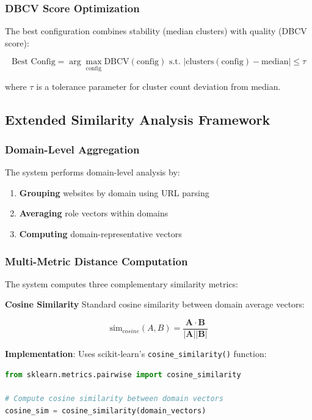 \subsubsection{DBCV Score Optimization}
The best configuration combines stability (median clusters) with quality (DBCV score):

\begin{equation}
\text{Best Config} = \arg\max_{\text{config}} \text{DBCV}(\text{config}) \text{ s.t. } |\text{clusters}(\text{config}) - \text{median}| \leq \tau
\end{equation}

where $\tau$ is a tolerance parameter for cluster count deviation from median.

\subsection{Extended Similarity Analysis Framework}
\label{subsec:more-similarity}

\subsubsection{Domain-Level Aggregation}
The system performs domain-level analysis by:

\begin{enumerate}
    \item \textbf{Grouping} websites by domain using URL parsing
    \item \textbf{Averaging} role vectors within domains
    \item \textbf{Computing} domain-representative vectors
\end{enumerate}

\subsubsection{Multi-Metric Distance Computation}
The system computes three complementary similarity metrics:

\textbf{Cosine Similarity}
Standard cosine similarity between domain average vectors:

\begin{equation}
\text{sim}_{cosine}(A,B) = \frac{\mathbf{A} \cdot \mathbf{B}}{|\mathbf{A}||\mathbf{B}|}
\end{equation}

\textbf{Implementation}: Uses scikit-learn's \texttt{cosine\_similarity()} function:

\begin{tcolorbox}[
    colback=gray!5!white,
    colframe=gray!60!black,
    title=\textbf{Cosine Similarity Computation},
    fonttitle=\bfseries,
    enhanced,
    arc=2mm,
    boxrule=0.5pt
]
\begin{lstlisting}[language=Python]
from sklearn.metrics.pairwise import cosine_similarity

# Compute cosine similarity between domain vectors
cosine_sim = cosine_similarity(domain_vectors)
\end{lstlisting}
\end{tcolorbox}

